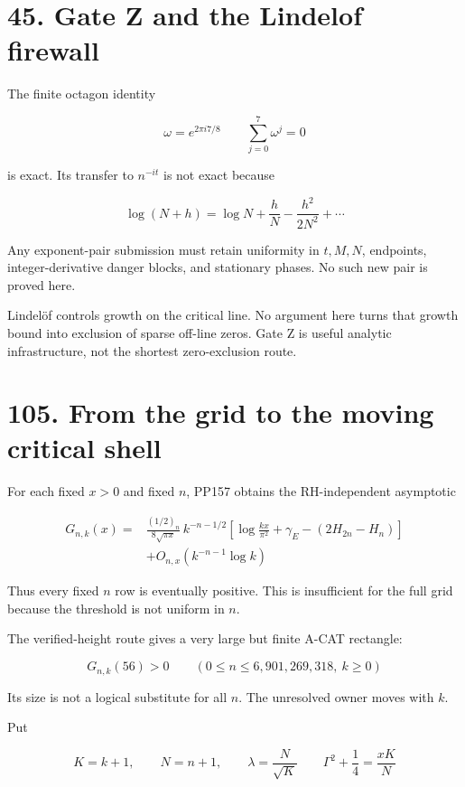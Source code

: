 \documentclass[
  11pt,
]{book}
\begin{document}
\section{45. Gate Z and the Lindelof
firewall}\label{gate-z-and-the-lindelof-firewall}

The finite octagon identity

\[
\omega=e^{2\pi i7/8}
\qquad
\sum_{j=0}^{7}\omega^j=0
\]

is exact. Its transfer to \(n^{-it}\) is not exact because

\[
\log(N+h)=\log N+\frac hN-\frac{h^2}{2N^2}+\cdots
\]

Any exponent-pair submission must retain uniformity in \(t,M,N\),
endpoints, integer-derivative danger blocks, and stationary phases. No
such new pair is proved here.

Lindelöf controls growth on the critical line. No argument here turns
that growth bound into exclusion of sparse off-line zeros. Gate Z is
useful analytic infrastructure, not the shortest zero-exclusion route.

\section{105. From the grid to the moving critical
shell}\label{from-the-grid-to-the-moving-critical-shell}

For each fixed \(x>0\) and fixed \(n\), PP157 obtains the RH-independent
asymptotic

\[
\boxed{
\begin{aligned}
G_{n,k}(x)
={}&
\frac{(1/2)_n}{8\sqrt{\pi x}}\,
k^{-n-1/2}
\left[
\log\frac{kx}{\pi^2}
+\gamma_E-(2H_{2n}-H_n)
\right] \\
&+O_{n,x}(k^{-n-1}\log k)
\end{aligned}
}
\tag{105.1}
\]

Thus every fixed \(n\) row is eventually positive. This is insufficient
for the full grid because the threshold is not uniform in \(n\).

The verified-height route gives a very large but finite A-CAT rectangle:

\[
G_{n,k}(56)>0
\qquad
(0\le n\le6{,}901{,}269{,}318,\ k\ge0)
\tag{105.2}
\]

Its size is not a logical substitute for all \(n\). The unresolved owner
moves with \(k\).

Put

\[
K=k+1,\qquad N=n+1,\qquad
\lambda=\frac{N}{\sqrt K}
\qquad
\Gamma^2+\frac14=\frac{xK}{N}
\tag{105.3}
\]
\end{document}
